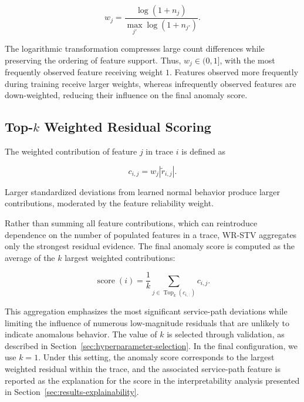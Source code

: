 \begin{equation}
w_j
=
\frac{\log(1+n_j)}
{\max_{j'} \log(1+n_{j'})}.
\label{eq:weight}
\end{equation}

\noindent The logarithmic transformation compresses large count
differences while preserving the ordering of feature support. Thus,
\(w_j \in (0,1]\), with the most frequently observed feature receiving
weight \(1\). Features observed more frequently during training receive
larger weights, whereas infrequently observed features are down-weighted,
reducing their influence on the final anomaly score.

\subsection{Top-\(k\) Weighted Residual Scoring}

The weighted contribution of feature \(j\) in trace \(i\) is defined as

\begin{equation}
c_{i,j}
=
w_j
\left|
\tilde{r}_{i,j}
\right|.
\label{eq:contribution}
\end{equation}

\noindent Larger standardized deviations from learned normal behavior
produce larger contributions, moderated by the feature reliability
weight.

Rather than summing all feature contributions, which can reintroduce
dependence on the number of populated features in a trace, WR-STV
aggregates only the strongest residual evidence. The final anomaly score
is computed as the average of the \(k\) largest weighted contributions:

\begin{equation}
\operatorname{score}(i)
=
\frac{1}{k}
\sum_{j \in \operatorname{Top}_k(c_{i,:})}
c_{i,j}.
\label{eq:topk}
\end{equation}

\noindent This aggregation emphasizes the most significant service-path
deviations while limiting the influence of numerous low-magnitude
residuals that are unlikely to indicate anomalous behavior. The value of
\(k\) is selected through validation, as described in
Section~\ref{sec:hyperparameter-selection}. In the final configuration,
we use \(k=1\). Under this setting, the anomaly score corresponds to the
largest weighted residual within the trace, and the associated
service-path feature is reported as the explanation for the score in the
interpretability analysis presented in
Section~\ref{sec:results-explainability}.

